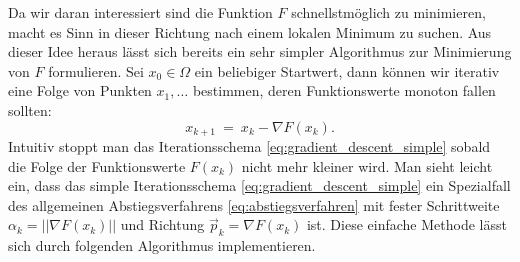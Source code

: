 Da wir daran interessiert sind die Funktion $F$ schnellstmöglich zu minimieren, macht es Sinn in dieser Richtung nach einem lokalen Minimum zu suchen. 
Aus dieser Idee heraus lässt sich bereits ein sehr simpler Algorithmus zur Minimierung von $F$ formulieren. Sei $x_0 \in \Omega$ ein beliebiger Startwert, dann können wir iterativ eine Folge von Punkten $x_1,\ldots$ bestimmen, deren Funktionswerte monoton fallen sollten: 
\begin{equation}
\label{eq:gradient_descent_simple}
x_{k+1} \ = \ x_k - \nabla F(x_k).
\end{equation}
Intuitiv stoppt man das Iterationsschema \eqref{eq:gradient_descent_simple} sobald die Folge der Funktionswerte $F(x_k)$ nicht mehr kleiner wird.
Man sieht leicht ein, dass das simple Iterationsschema \eqref{eq:gradient_descent_simple} ein Spezialfall des allgemeinen Abstiegsverfahrens \eqref{eq:abstiegsverfahren} mit fester Schrittweite $\alpha_k = ||\nabla F(x_k)||$ und Richtung $\vec{p}_k = \nabla F(x_k)$ ist.
Diese einfache Methode lässt sich durch folgenden Algorithmus implementieren.

